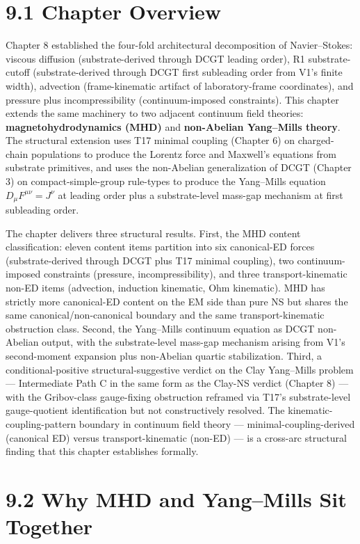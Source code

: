 \documentclass[11pt]{book}
\begin{document}
\section{9.1 Chapter Overview}

Chapter 8 established the four-fold architectural decomposition of Navier–Stokes: viscous diffusion (substrate-derived through DCGT leading order), R1 substrate-cutoff (substrate-derived through DCGT first subleading order from V1's finite width), advection (frame-kinematic artifact of laboratory-frame coordinates), and pressure plus incompressibility (continuum-imposed constraints). This chapter extends the same machinery to two adjacent continuum field theories: \textbf{magnetohydrodynamics (MHD)} and \textbf{non-Abelian Yang–Mills theory}. The structural extension uses T17 minimal coupling (Chapter 6) on charged-chain populations to produce the Lorentz force and Maxwell's equations from substrate primitives, and uses the non-Abelian generalization of DCGT (Chapter 3) on compact-simple-group rule-types to produce the Yang–Mills equation $D_\mu F^{\mu\nu} = J^\nu$ at leading order plus a substrate-level mass-gap mechanism at first subleading order.

The chapter delivers three structural results. First, the MHD content classification: eleven content items partition into six canonical-ED forces (substrate-derived through DCGT plus T17 minimal coupling), two continuum-imposed constraints (pressure, incompressibility), and three transport-kinematic non-ED items (advection, induction kinematic, Ohm kinematic). MHD has strictly more canonical-ED content on the EM side than pure NS but shares the same canonical/non-canonical boundary and the same transport-kinematic obstruction class. Second, the Yang–Mills continuum equation as DCGT non-Abelian output, with the substrate-level mass-gap mechanism arising from V1's second-moment expansion plus non-Abelian quartic stabilization. Third, a conditional-positive structural-suggestive verdict on the Clay Yang–Mills problem — Intermediate Path C in the same form as the Clay-NS verdict (Chapter 8) — with the Gribov-class gauge-fixing obstruction reframed via T17's substrate-level gauge-quotient identification but not constructively resolved. The kinematic-coupling-pattern boundary in continuum field theory — minimal-coupling-derived (canonical ED) versus transport-kinematic (non-ED) — is a cross-arc structural finding that this chapter establishes formally.

\section{9.2 Why MHD and Yang–Mills Sit Together}
\end{document}

